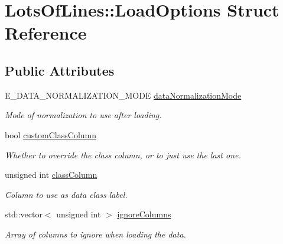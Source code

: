 \hypertarget{struct_lots_of_lines_1_1_load_options}{}\section{Lots\+Of\+Lines\+:\+:Load\+Options Struct Reference}
\label{struct_lots_of_lines_1_1_load_options}
\subsection*{Public Attributes}
\begin{DoxyCompactItemize}
\item 
E\+\_\+\+D\+A\+T\+A\+\_\+\+N\+O\+R\+M\+A\+L\+I\+Z\+A\+T\+I\+O\+N\+\_\+\+M\+O\+DE \hyperlink{struct_lots_of_lines_1_1_load_options_aaa84493d2ccff03e0c44c604418f45d4}{data\+Normalization\+Mode}\hypertarget{struct_lots_of_lines_1_1_load_options_aaa84493d2ccff03e0c44c604418f45d4}{}\label{struct_lots_of_lines_1_1_load_options_aaa84493d2ccff03e0c44c604418f45d4}

\begin{DoxyCompactList}\small\item\em Mode of normalization to use after loading. \end{DoxyCompactList}\item 
bool \hyperlink{struct_lots_of_lines_1_1_load_options_aebc8f69db09dab1ffe878a758adf2546}{custom\+Class\+Column}\hypertarget{struct_lots_of_lines_1_1_load_options_aebc8f69db09dab1ffe878a758adf2546}{}\label{struct_lots_of_lines_1_1_load_options_aebc8f69db09dab1ffe878a758adf2546}

\begin{DoxyCompactList}\small\item\em Whether to override the class column, or to just use the last one. \end{DoxyCompactList}\item 
unsigned int \hyperlink{struct_lots_of_lines_1_1_load_options_a67ed8b21547e5d38e0c3ecebca3afc7e}{class\+Column}\hypertarget{struct_lots_of_lines_1_1_load_options_a67ed8b21547e5d38e0c3ecebca3afc7e}{}\label{struct_lots_of_lines_1_1_load_options_a67ed8b21547e5d38e0c3ecebca3afc7e}

\begin{DoxyCompactList}\small\item\em Column to use as data class label. \end{DoxyCompactList}\item 
std\+::vector$<$ unsigned int $>$ \hyperlink{struct_lots_of_lines_1_1_load_options_aa31ca1ba223ee074bf175594e66e6f1f}{ignore\+Columns}\hypertarget{struct_lots_of_lines_1_1_load_options_aa31ca1ba223ee074bf175594e66e6f1f}{}\label{struct_lots_of_lines_1_1_load_options_aa31ca1ba223ee074bf175594e66e6f1f}

\begin{DoxyCompactList}\small\item\em Array of columns to ignore when loading the data. \end{DoxyCompactList}\end{DoxyCompactItemize}
